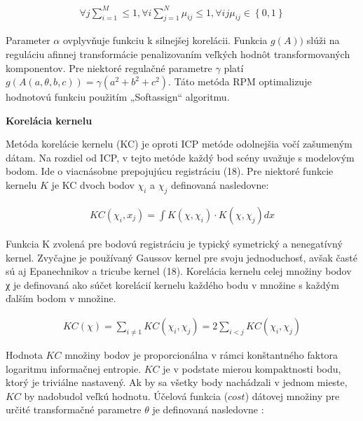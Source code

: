 \begin{equation}
\label{eq13}
\begin{aligned}
\forall j \sum_{i=1}^{M} \leq 1, \forall i \sum_{j=1}^{N} \mu_{ij} \leq 1, \forall ij \mu_{ij} \in \left\lbrace 0,1 \right\rbrace 
\end{aligned}
\end{equation}

Parameter $\alpha$ ovplyvňuje funkciu k silnejšej korelácii. Funkcia $g\left(A\right))$ slúži na reguláciu afinnej transformácie penalizovaním veľkých hodnôt transformovaných komponentov. Pre niektoré regulačné parametre $\gamma$ platí $g\left(A\left(a, \theta, b, c\right)\right) = \gamma \left(a^2 + b^2 + c^2 \right)$. Táto metóda RPM optimalizuje hodnotovú funkciu použitím „Softassign“ algoritmu.

\textbf{Korelácia kernelu}

Metóda korelácie kernelu (KC) je oproti ICP metóde odolnejšia vočí zašumeným dátam. Na rozdiel od ICP, v tejto metóde každý bod scény uvažuje s modelovým bodom. Ide o viacnásobne prepojujúcu registráciu (18). Pre niektoré funkcie kernelu $K$ je KC dvoch bodov $\chi_i$ a $\chi_j$ definovaná nasledovne:

\begin{equation}
\label{eq14}
\begin{aligned}
KC\left(\chi_i,x_j\right)=\int K\left(\chi,\chi_i\right) \cdot K\left(\chi,\chi_j\right) dx 
\end{aligned}
\end{equation}

Funkcia K zvolená pre bodovú registráciu je typický symetrický a nenegatívný kernel. Zvyčajne je používaný Gaussov kernel pre svoju jednoduchosť, avšak časté sú aj Epanechnikov a tricube kernel (18). Korelácia kernelu celej množiny bodov χ je definovaná ako súčet korelácií kernelu každého bodu v množine s každým ďalším bodom v množine.


\begin{equation}
\label{eq15}
\begin{aligned}
KC\left(\chi\right) = \sum_{i\ne1} KC\left(\chi_i,\chi_j\right)=2\sum_{i<j} KC\left(\chi_i,\chi_j\right)
\end{aligned}
\end{equation}

Hodnota $KC$ množiny bodov je proporcionálna v rámci konštantného faktora logaritmu informačnej entropie. $KC$ je v podstate mierou kompaktnosti bodu, ktorý je triviálne nastavený. Ak by sa všetky body nachádzali v jednom mieste, $KC$ by nadobudol veľkú hodnotu. Účelová funkcia ($cost$) dátovej množiny pre určité transformačné parametre $\theta$ je definovaná nasledovne :


